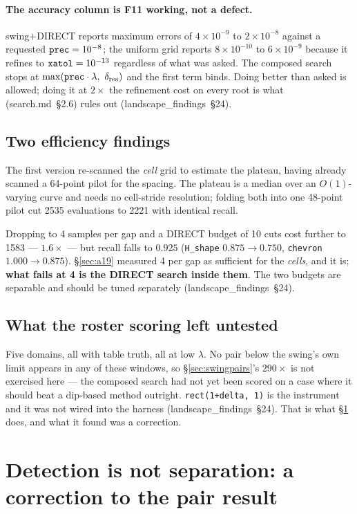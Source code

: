 \documentclass[11pt]{article}
\newcommand{\file}[1]{\texttt{#1}}
\newcommand{\lf}[1]{(landscape\_findings~\S#1)}
\newcommand{\sm}[1]{(search.md~\S#1)}
\newcommand{\lam}{\lambda}
\begin{document}
\paragraph{The accuracy column is F11 working, not a defect.} swing$+$DIRECT reports maximum errors
of $4\times10^{-9}$ to $2\times10^{-8}$ against a requested $\verb|prec| = 10^{-8}$; the uniform
grid reports $8\times10^{-10}$ to $6\times10^{-9}$ because it refines to
$\verb|xatol| = 10^{-13}$ regardless of what was asked. The composed search stops at
$\max(\verb|prec|\cdot\lam,\ \delta_{\mathrm{res}})$ and the first term binds. Doing better than
asked is allowed; doing it at $2\times$ the refinement cost on every root is what \sm{2.6} rules
out \lf{24}.

\subsection{Two efficiency findings}

The first version re-scanned the \emph{cell} grid to estimate the plateau, having already scanned
a 64-point pilot for the spacing. The plateau is a median over an $O(1)$-varying curve and needs no
cell-stride resolution; folding both into one 48-point pilot cut 2535 evaluations to 2221 with
identical recall.

Dropping to 4 samples per gap and a DIRECT budget of 10 cuts cost further to 1583 --- $1.6\times$
--- but recall falls to $0.925$ (\file{H\_shape} $0.875 \to 0.750$, \file{chevron}
$1.000 \to 0.875$). \S\ref{sec:a19} measured 4 per gap as sufficient for the \emph{cells}, and it
is; \textbf{what fails at 4 is the DIRECT search inside them}. The two budgets are separable and
should be tuned separately \lf{24}.

\subsection{What the roster scoring left untested}

Five domains, all with table truth, all at low $\lam$. No pair below the swing's own limit appears
in any of these windows, so \S\ref{sec:swingpairs}'s $290\times$ is not exercised here --- the
composed search had not yet been scored on a case where it should beat a dip-based method
outright. \verb|rect(1+delta, 1)| is the instrument and it was not wired into the harness
\lf{24}. That is what \S\ref{sec:sep} does, and what it found was a correction.

\section{Detection is not separation: a correction to the pair result}
\label{sec:sep}
\end{document}
